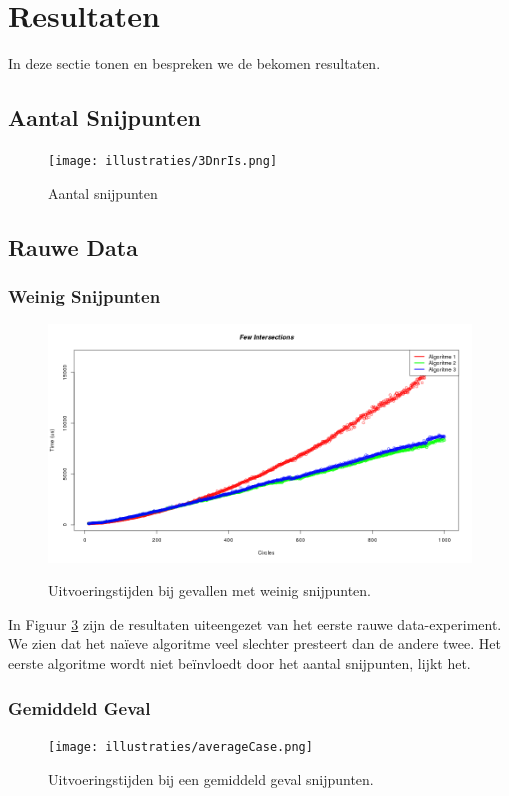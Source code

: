 \newpage
\section{Resultaten}
In deze sectie tonen en bespreken we de bekomen resultaten.

\subsection{Aantal Snijpunten}
\begin{figure}[H]
   	\centering
   	\texttt{[image: illustraties/3DnrIs.png]}
  	\label{fig:nr_intersections}
  	\caption{Aantal snijpunten}
\end{figure}

\subsection{Rauwe Data}
\subsubsection{Weinig Snijpunten}
\begin{figure}[H]
   	\centering
   	\includegraphics[width=\textwidth]{illustraties/fewIntersections.png}
  	\label{fig:few_intersections}
  	\caption{Uitvoeringstijden bij gevallen met weinig snijpunten.}
\end{figure}
In Figuur \ref{fig:few_intersections} zijn de resultaten uiteengezet van het eerste rauwe data-experiment. We zien dat het na\"ieve algoritme veel slechter presteert dan de andere twee. Het eerste algoritme wordt niet be\"invloedt door het aantal snijpunten, lijkt het.

\subsubsection{Gemiddeld Geval}
\begin{figure}[H]
	\centering
   	\texttt{[image: illustraties/averageCase.png]}
  	\label{fig:few_intersections}
  	\caption{Uitvoeringstijden bij een gemiddeld geval snijpunten.}
\end{figure}
   
